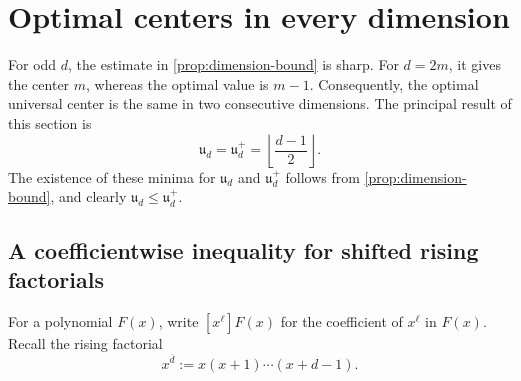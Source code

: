 \documentclass[reqno, 12pt]{article}
\numberwithin{equation}{section}
\theoremstyle{definition}
\begin{document}
\section{Optimal centers in every dimension}\label{sec:optimal-universal-shift}

For odd $d$, the estimate in \cref{prop:dimension-bound} is sharp.  For $d=2m$, it gives the center $m$, whereas the optimal value is $m-1$. Consequently, the optimal universal center is the same in two consecutive dimensions.
The principal result of this section is
\begin{equation*}
 \mathfrak u_d=\mathfrak u_d^+ =\left\lfloor\frac{d-1}{2}\right\rfloor.
\end{equation*}
The existence of these minima for $\mathfrak u_d$ and $\mathfrak u_d^+$ follows from \cref{prop:dimension-bound}, and clearly $\mathfrak u_d\leq\mathfrak u_d^+$.

\subsection{A coefficientwise inequality for shifted rising factorials}

For a polynomial $F(x)$, write $[x^\ell]F(x)$ for the coefficient of
$x^\ell$ in $F(x)$.  Recall the rising factorial
\[
 x^{\overline d}:=x(x+1)\cdots(x+d-1).
\]
\end{document}
